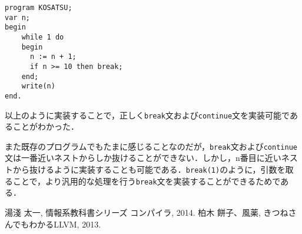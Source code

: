 \documentclass[uplatex]{jsarticle}
\begin{document}
\begin{lstlisting}[caption=pl0a.p,label=lst:ex5:kosathu.p]
program KOSATSU;
var n;
begin
    while 1 do
    begin
      n := n + 1;
      if n >= 10 then break;
    end;
    write(n)
end.
\end{lstlisting}

以上のように実装することで，正しく\verb#break#文および\verb#continue#文を実装可能であることがわかった．

また既存のプログラムでもたまに感じることなのだが，\verb#break#文および\verb#continue#文は一番近いネストからしか抜けることができない．しかし，n番目に近いネストから抜けるように実装することも可能である．\verb#break(1)#のように，引数を取ることで，より汎用的な処理を行う\verb#break#文を実装することができるためである．

\begin{thebibliography}{9}
   湯淺 太一, 情報系教科書シリーズ コンパイラ, 2014.
   柏木 餅子、風薬, きつねさんでもわかるLLVM, 2013.
\end{thebibliography}
\end{document}

